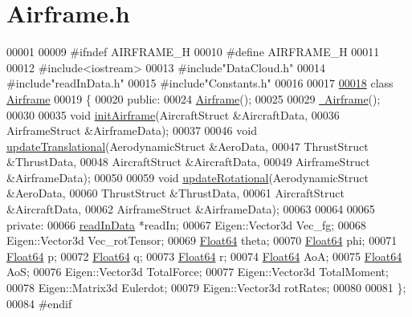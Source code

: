 \hypertarget{_airframe_8h_source}{}\section{Airframe.\+h}
\label{_airframe_8h_source}

\begin{DoxyCode}
00001 
00009 \textcolor{preprocessor}{#ifndef AIRFRAME\_H}
00010 \textcolor{preprocessor}{#define AIRFRAME\_H}
00011 
00012 \textcolor{preprocessor}{#include<iostream>}
00013 \textcolor{preprocessor}{#include"DataCloud.h"}
00014 \textcolor{preprocessor}{#include"readInData.h"}
00015 \textcolor{preprocessor}{#include"Constants.h"}
00016 
00017 
\hyperlink{group___airframe}{00018} \textcolor{keyword}{class }\hyperlink{group___airframe_class_airframe}{Airframe}
00019 \{
00020 \textcolor{keyword}{public}:
00024     \hyperlink{group___airframe_a5e6632c7d0c5bc5b889de6cc2407944f}{Airframe}();
00025 
00029     \hyperlink{group___airframe_af849116afbf7c4d7d2d5c189ff68cb7d}{~Airframe}();
00030 
00035     \textcolor{keywordtype}{void} \hyperlink{group___airframe_a57b5f7a74d11723186f34fc183e1581b}{initAirframe}(AircraftStruct    &AircraftData,
00036                       AirframeStruct    &AirframeData);
00037 
00046     \textcolor{keywordtype}{void} \hyperlink{group___airframe_ab3e18bd40fd5e68d793a164654a2821a}{updateTranslational}(AerodynamicStruct  &AeroData,
00047                              ThrustStruct       &ThrustData,
00048                               AircraftStruct    &AircraftData,
00049                             AirframeStruct &AirframeData);
00050 
00059     \textcolor{keywordtype}{void} \hyperlink{group___airframe_af506bca34fa40f9ec0613b3be8f726eb}{updateRotational}(AerodynamicStruct  &AeroData,
00060                             ThrustStruct        &ThrustData,
00061                             AircraftStruct  &AircraftData,
00062                             AirframeStruct &AirframeData);
00063 
00064 
00065 \textcolor{keyword}{private}:
00066     \hyperlink{classread_in_data}{readInData} *readIn;
00067     Eigen::Vector3d Vec\_fg;
00068     Eigen::Vector3d Vec\_rotTensor;
00069     \hyperlink{group___tools_ga3f1431cb9f76da10f59246d1d743dc2c}{Float64} theta;
00070     \hyperlink{group___tools_ga3f1431cb9f76da10f59246d1d743dc2c}{Float64} phi;
00071     \hyperlink{group___tools_ga3f1431cb9f76da10f59246d1d743dc2c}{Float64} p;
00072     \hyperlink{group___tools_ga3f1431cb9f76da10f59246d1d743dc2c}{Float64} q;
00073     \hyperlink{group___tools_ga3f1431cb9f76da10f59246d1d743dc2c}{Float64} r;
00074     \hyperlink{group___tools_ga3f1431cb9f76da10f59246d1d743dc2c}{Float64} AoA;
00075     \hyperlink{group___tools_ga3f1431cb9f76da10f59246d1d743dc2c}{Float64} AoS;
00076     Eigen::Vector3d TotalForce;
00077     Eigen::Vector3d TotalMoment;
00078     Eigen::Matrix3d Eulerdot;
00079     Eigen::Vector3d rotRates;
00080 
00081 \};
00084 \textcolor{preprocessor}{#endif }
\end{DoxyCode}
